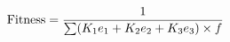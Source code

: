 \documentclass[preview]{standalone}
\begin{document}
\begin{align*}
\special{dvisvgm:raw <g id='unique000'>}\text{Fitness} = \frac{1}{\sum (K_1 e_1 + K_2 e_2 + K_3 e_3) \times f}\special{dvisvgm:raw </g>}
\end{align*}
\end{document}
